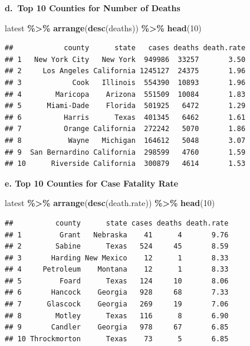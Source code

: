\documentclass[
  openany]{book}
\newenvironment{Shaded}{\begin{snugshade}}{\end{snugshade}}
\newcommand{\DecValTok}[1]{\textcolor[rgb]{0.00,0.00,0.81}{#1}}
\newcommand{\FunctionTok}[1]{\textcolor[rgb]{0.13,0.29,0.53}{\textbf{#1}}}
\newcommand{\NormalTok}[1]{#1}
\newcommand{\SpecialCharTok}[1]{\textcolor[rgb]{0.81,0.36,0.00}{\textbf{#1}}}
\begin{document}
\textbf{d.~Top 10 Counties for Number of Deaths}

\begin{Shaded}
\begin{Highlighting}[]
\NormalTok{latest }\SpecialCharTok{\%\textgreater{}\%} 
  \FunctionTok{arrange}\NormalTok{(}\FunctionTok{desc}\NormalTok{(deaths)) }\SpecialCharTok{\%\textgreater{}\%} 
  \FunctionTok{head}\NormalTok{(}\DecValTok{10}\NormalTok{)}
\end{Highlighting}
\end{Shaded}

\begin{verbatim}
##            county      state   cases deaths death.rate
## 1   New York City   New York  949986  33257       3.50
## 2     Los Angeles California 1245127  24375       1.96
## 3            Cook   Illinois  554390  10893       1.96
## 4        Maricopa    Arizona  551509  10084       1.83
## 5      Miami-Dade    Florida  501925   6472       1.29
## 6          Harris      Texas  401345   6462       1.61
## 7          Orange California  272242   5070       1.86
## 8           Wayne   Michigan  164612   5048       3.07
## 9  San Bernardino California  298599   4760       1.59
## 10      Riverside California  300879   4614       1.53
\end{verbatim}

\textbf{e. Top 10 Counties for Case Fatality Rate}

\begin{Shaded}
\begin{Highlighting}[]
\NormalTok{latest }\SpecialCharTok{\%\textgreater{}\%} 
  \FunctionTok{arrange}\NormalTok{(}\FunctionTok{desc}\NormalTok{(death.rate)) }\SpecialCharTok{\%\textgreater{}\%} 
  \FunctionTok{head}\NormalTok{(}\DecValTok{10}\NormalTok{)}
\end{Highlighting}
\end{Shaded}

\begin{verbatim}
##          county      state cases deaths death.rate
## 1         Grant   Nebraska    41      4       9.76
## 2        Sabine      Texas   524     45       8.59
## 3       Harding New Mexico    12      1       8.33
## 4     Petroleum    Montana    12      1       8.33
## 5         Foard      Texas   124     10       8.06
## 6       Hancock    Georgia   928     68       7.33
## 7      Glascock    Georgia   269     19       7.06
## 8        Motley      Texas   116      8       6.90
## 9       Candler    Georgia   978     67       6.85
## 10 Throckmorton      Texas    73      5       6.85
\end{verbatim}
\end{document}
